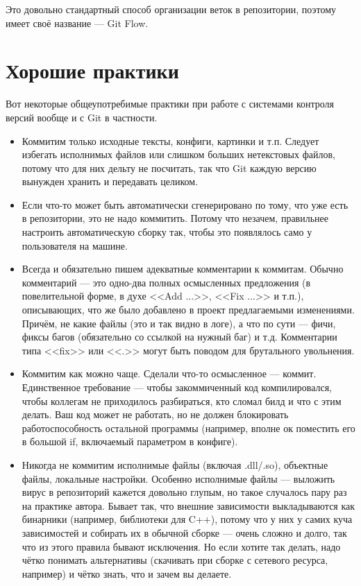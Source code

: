 \documentclass{../../text-style}
\begin{document}
Это довольно стандартный способ организации веток в репозитории, поэтому имеет своё название --- Git Flow.

\section{Хорошие практики}

Вот некоторые общеупотребимые практики при работе с системами контроля версий вообще и с Git в частности.

\begin{itemize}
    \item Коммитим только исходные тексты, конфиги, картинки и т.п. Следует избегать исполнимых файлов или слишком больших нетекстовых файлов, потому что для них дельту не посчитать, так что Git каждую версию вынужден хранить и передавать целиком.
    \item Если что-то может быть автоматически сгенерировано по тому, что уже есть в репозитории, это не надо коммитить. Потому что незачем, правильнее настроить автоматическую сборку так, чтобы это появлялось само у пользователя на машине.
    \item Всегда и обязательно пишем адекватные комментарии к коммитам. Обычно комментарий --- это одно-два полных осмысленных предложения (в повелительной форме, в духе <<Add ...>>, <<Fix ...>> и т.п.), описывающих, что же было добавлено в проект предлагаемыми изменениями. Причём, не какие файлы (это и так видно в логе), а что по сути --- фичи, фиксы багов (обязательно со ссылкой на нужный баг) и т.д. Комментарии типа <<fix>> или <<.>> могут быть поводом для брутального увольнения.
    \item Коммитим как можно чаще. Сделали что-то осмысленное --- коммит. Единственное требование --- чтобы закоммиченный код компилировался, чтобы коллегам не приходилось разбираться, кто сломал билд и что с этим делать. Ваш код может не работать, но не должен блокировать работоспособность остальной программы (например, вполне ок поместить его в большой if, включаемый параметром в конфиге).
    \item Никогда не коммитим исполнимые файлы (включая .dll/.so), объектные файлы, локальные настройки. Особенно исполнимые файлы --- выложить вирус в репозиторий кажется довольно глупым, но такое случалось пару раз на практике автора. Бывает так, что внешние зависимости выкладываются как бинарники (например, библиотеки для C++), потому что у них у самих куча зависимостей и собирать их в обычной сборке --- очень сложно и долго, так что из этого правила бывают исключения. Но если хотите так делать, надо чётко понимать альтернативы (скачивать при сборке с сетевого ресурса, например) и чётко знать, что и зачем вы делаете.

\end{itemize}
\end{document}
